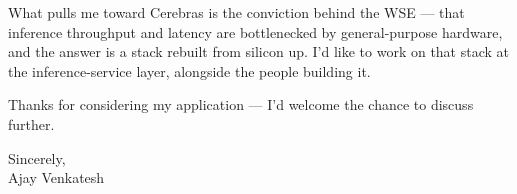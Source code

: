 \documentclass[letterpaper,11pt]{article}
\begin{document}
What pulls me toward Cerebras is the conviction behind the WSE --- that inference throughput and latency are bottlenecked by general-purpose hardware, and the answer is a stack rebuilt from silicon up. I'd like to work on that stack at the inference-service layer, alongside the people building it.

Thanks for considering my application --- I'd welcome the chance to discuss further.

\vspace{12pt}

Sincerely, \\
Ajay Venkatesh
\end{document}
